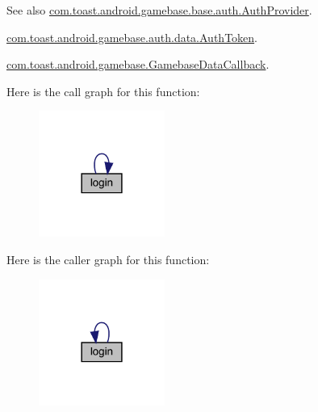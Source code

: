\begin{DoxySeeAlso}{See also}
\hyperlink{interfacecom_1_1toast_1_1android_1_1gamebase_1_1base_1_1auth_1_1_auth_provider}{com.\+toast.\+android.\+gamebase.\+base.\+auth.\+Auth\+Provider}. 

\hyperlink{classcom_1_1toast_1_1android_1_1gamebase_1_1auth_1_1data_1_1_auth_token}{com.\+toast.\+android.\+gamebase.\+auth.\+data.\+Auth\+Token}. 

\hyperlink{interfacecom_1_1toast_1_1android_1_1gamebase_1_1_gamebase_data_callback}{com.\+toast.\+android.\+gamebase.\+Gamebase\+Data\+Callback}. 
\end{DoxySeeAlso}
Here is the call graph for this function\+:
\nopagebreak
\begin{figure}[H]
\begin{center}
\leavevmode
\includegraphics[width=117pt]{classcom_1_1toast_1_1android_1_1gamebase_1_1_gamebase_a277a8a1672aeb0ac6b20e7ebcd4e09b5_cgraph}
\end{center}
\end{figure}
Here is the caller graph for this function\+:
\nopagebreak
\begin{figure}[H]
\begin{center}
\leavevmode
\includegraphics[width=117pt]{classcom_1_1toast_1_1android_1_1gamebase_1_1_gamebase_a277a8a1672aeb0ac6b20e7ebcd4e09b5_icgraph}
\end{center}
\end{figure}
\mbox{\label{classcom_1_1toast_1_1android_1_1gamebase_1_1_gamebase_aff74a9c4ea1a737026d9507d6e9827e8}} 
